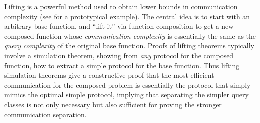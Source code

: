 
Lifting is a powerful method used to obtain lower bounds in communication complexity (see \cite{lifting} for a prototypical example). 
The central idea is to start with an arbitrary base function,
and ``lift it'' via function composition to get a new composed
function whose {\it communication complexity} is essentially the same as the
{\it query} {\it complexity} of the original base function.
Proofs of lifting theorems typically involve a simulation theorem, showing
from {\it any} protocol for the composed function,
how to extract a simple protocol for the base function. 
Thus lifting simulation theorems give a constructive proof
that the most efficient communication for the composed problem is essentially the protocol that simply mimics the optimal simple protocol, implying that separating  the simpler query classes is not only necessary but also sufficient for proving the  stronger communication separation.


